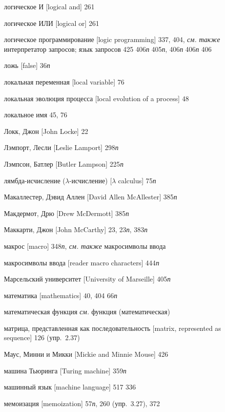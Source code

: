 \begin{theindex}
\item {логическое И [logical and]} 261
\item {логическое ИЛИ [logical or]} 261
\item {логическое программирование [logic programming]} 337, 404, {\it см. также} интерпретатор запросов; язык запросов
   425
   406{\it п}
   405{\it п}, 406{\it п}
   406{\it п}
   406
\item {ложь [false]} 36{\it п}
\item {локальная переменная [local variable]} 76
\item {локальная эволюция процесса [local evolution of a process]} 48
\item {локальное имя} 45, 76
\item {Локк, Джон [John Locke]} 22
\item {Лэмпорт, Лесли [Leslie Lamport]} 298{\it п}
\item {Лэмпсон, Батлер [Butler Lampson]} 225{\it п}
\item {лямбда-исчисление ($\lambda$-исчисление) [$\lambda$ calculus]} 75{\it п}
\bigskip
\item {Макаллестер, Дэвид Аллен [David Allen McAllester]} 385{\it п}
\item {Макдермот, Дрю [Drew McDermott]} 385{\it п}
\item {Маккарти, Джон [John McCarthy]} 23, 23{\it п}, 383{\it п}
\item {макрос [macro]} 348{\it п}, {\it см. также} макросимволы ввода
\item {макросимволы ввода [reader macro characters]} 444{\it п}
\item {Марсельский университет [University of Marseille]} 405{\it п}
\item {математика [mathematics]}
   40, 404
   66{\it п}
\item {математическая функция} {\it см.} функция (математическая)
\item {матрица, представленная как последовательность [matrix, represented as sequ\-ence]} 126 (упр.~2.37)
\item {Маус, Минни и Микки [Mickie and Minnie Mouse]} 426
\item {машина Тьюринга [Turing machine]} 359{\it п}
\item {машинный язык [machine language]} 517
   336
\item {мемоизация [memoization]} 57{\it п}, 260 (упр.~3.27), 372

\end{theindex}

